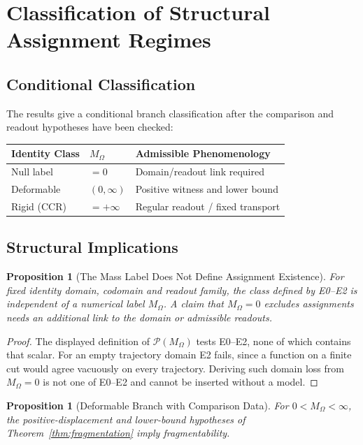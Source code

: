 \documentclass[11pt,a4paper]{article}
\theoremstyle{plain}
\newtheorem{proposition}[theorem]{Proposition}
\theoremstyle{definition}
\theoremstyle{remark}
\begin{document}
\section{Classification of Structural Assignment Regimes}

\subsection{Conditional Classification}

The results give a conditional branch classification after the comparison and readout hypotheses have been checked:

\begin{center}
\begin{tabular}{|l|l|l|}
\hline
\textbf{Identity Class} & \textbf{$M_\Omega$} & \textbf{Admissible Phenomenology} \\
\hline
Null label & $= 0$ & Domain/readout link required \\
\hline
Deformable & $(0, \infty)$ & Positive witness and lower bound \\
\hline
Rigid (CCR) & $= +\infty$ & Regular readout / fixed transport \\
\hline
\end{tabular}
\end{center}

\subsection{Structural Implications}

\begin{proposition}[The Mass Label Does Not Define Assignment Existence]
For fixed identity domain, codomain and readout family, the class defined by E0--E2 is independent of a numerical label $M_\Omega$. A claim that $M_\Omega=0$ excludes assignments needs an additional link to the domain or admissible readouts.
\end{proposition}

\begin{proof}
The displayed definition of $\mathcal P(M_\Omega)$ tests E0--E2, none of which contains that scalar. For an empty trajectory domain E2 fails, since a function on a finite cut would agree vacuously on every trajectory. Deriving such domain loss from $M_\Omega=0$ is not one of E0--E2 and cannot be inserted without a model.
\end{proof}

\begin{proposition}[Deformable Branch with Comparison Data]
For $0<M_\Omega<\infty$, the positive-displacement and lower-bound hypotheses of Theorem~\ref{thm:fragmentation} imply fragmentability.
\end{proposition}
\end{document}
